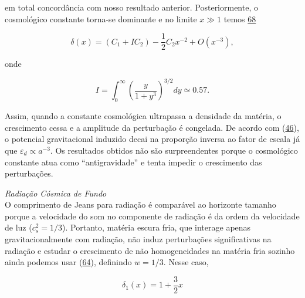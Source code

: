 \documentclass[a4paper,12pt]{article}
\begin{document}
em total concordância com nosso resultado anterior. Posteriormente, o cosmológico
constante torna-se dominante e no limite $x \gg 1$ temos \hyperref[eq68]{68}

\begin{equation}\label{eq69}
	\delta (x) = (C_1 + I C_2) -\frac{1}{2}C_2x^{-2} + O (x^{-3}),
\end{equation}

onde 

\begin{equation}\label{eq70}
	I = \int_{0}^{\infty} \left( \dfrac{y}{1+y^3}\right)^{3/2} dy \simeq 0.57 .
\end{equation}

Assim, quando a constante cosmológica ultrapassa a densidade da matéria, o crescimento cessa e a amplitude da perturbação é congelada. De acordo com (\hyperref[eq46]{46}), o potencial gravitacional induzido decai na proporção inversa ao fator de escala já que $\varepsilon_d \propto a^{-3}.$ Os resultados obtidos não são surpreendentes porque o cosmológico constante atua como “antigravidade” e tenta impedir o crescimento das perturbações.
\newline

\textit{Radiação Cósmica de Fundo} \\O comprimento de Jeans para radiação é comparável ao horizonte tamanho porque a velocidade do som no componente de radiação é da ordem da velocidade de luz ($c^2_s = 1/3$). Portanto, matéria escura fria, que interage apenas gravitacionalmente com radiação, não induz perturbações significativas na radiação e estudar o crescimento de não homogeneidades na matéria fria sozinho ainda podemos usar (\hyperref[eq64]{64}), definindo $w = 1/3$. Nesse caso,

\begin{equation}\label{eq71}
	\delta_1 (x) = 1+ \frac{3}{2}x
\end{equation}
\end{document}
